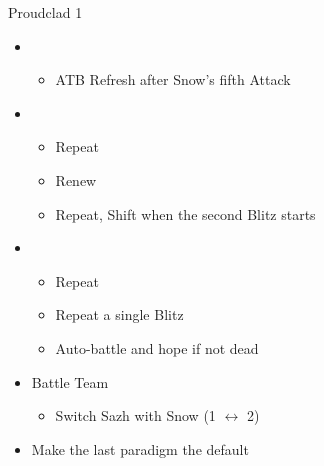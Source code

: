 \begin{battle}{Proudclad 1}
\begin{itemize}
\begin{itemize}
    \end{itemize}
    \item \first
    \begin{itemize}
        \item ATB Refresh after Snow's fifth Attack
    \end{itemize}
    \item \second
    \begin{itemize}
        \item Repeat
        \item Renew
        \item Repeat, Shift when the second Blitz starts
    \end{itemize}
    \item \first
    \begin{itemize}
        \item Repeat
        \item Repeat a single Blitz
        \item Auto-battle and hope if not dead
    \end{itemize}
\end{itemize}
\end{battle}
\begin{menu}
\begin{itemize}
    \paradigm
    \begin{itemize}
        \item Battle Team
        \begin{itemize}
            \item Switch Sazh with Snow (1 $\leftrightarrow$ 2)
        \end{itemize}
        \item Make the last paradigm the default
    \end{itemize}
\end{itemize}
\end{menu}
